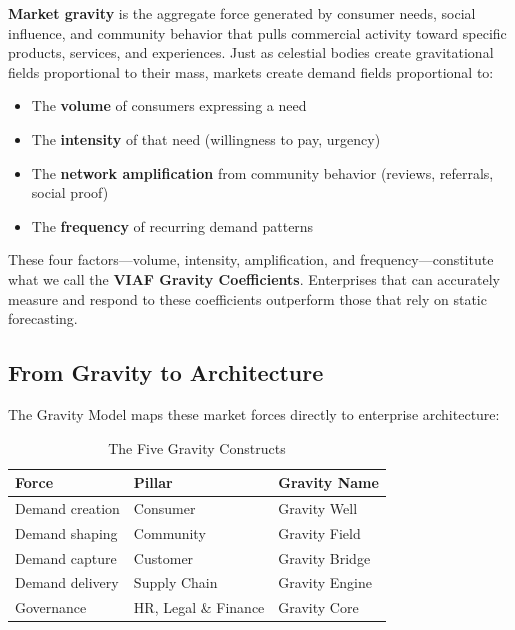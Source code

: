 \documentclass[11pt,a4paper,twocolumn]{article}
\begin{document}
\textbf{Market gravity} is the aggregate force generated by consumer needs, social influence, and community behavior that pulls commercial activity toward specific products, services, and experiences. Just as celestial bodies create gravitational fields proportional to their mass, markets create demand fields proportional to:

\begin{itemize}[leftmargin=1.5em]
  \item The \textbf{volume} of consumers expressing a need
  \item The \textbf{intensity} of that need (willingness to pay, urgency)
  \item The \textbf{network amplification} from community behavior (reviews, referrals, social proof)
  \item The \textbf{frequency} of recurring demand patterns
\end{itemize}

These four factors---volume, intensity, amplification, and frequency---constitute what we call the \textbf{VIAF Gravity Coefficients}. Enterprises that can accurately measure and respond to these coefficients outperform those that rely on static forecasting.

\subsection{From Gravity to Architecture}

The Gravity Model maps these market forces directly to enterprise architecture:

\begin{table}[H]
\centering
\small
\begin{tabular}{@{}p{2.4cm}p{2.2cm}p{2.1cm}@{}}
\toprule
\textbf{Force} & \textbf{Pillar} & \textbf{Gravity Name} \\
\midrule
Demand creation  & Consumer   & Gravity Well \\
Demand shaping   & Community  & Gravity Field \\
Demand capture   & Customer   & Gravity Bridge \\
Demand delivery  & Supply Chain & Gravity Engine \\
Governance       & HR, Legal \& Finance & Gravity Core \\
\bottomrule
\end{tabular}
\caption{The Five Gravity Constructs}
\label{tab:gravity-constructs}
\end{table}
\end{document}
